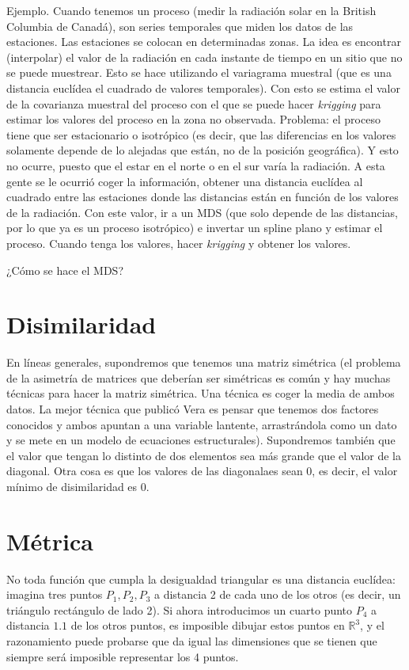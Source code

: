 \begin{description}
        Ejemplo. Cuando tenemos un proceso (medir la radiación solar en la British Columbia de Canadá), son series temporales que miden los datos de las estaciones. Las estaciones se colocan en determinadas zonas. La idea es encontrar (interpolar) el valor de la radiación en cada instante de tiempo en un sitio que no se puede muestrear. Esto se hace utilizando el variagrama muestral (que es una distancia euclídea el cuadrado de valores temporales). Con esto se estima el valor de la covarianza muestral del proceso con el que se puede hacer \textit{krigging} para estimar los valores del proceso en la zona no observada. Problema: el proceso tiene que ser estacionario o isotrópico (es decir, que las diferencias en los valores solamente depende de lo alejadas que están, no de la posición geográfica). Y esto no ocurre, puesto que el estar en el norte o en el sur varía la radiación. A esta gente se le ocurrió coger la información, obtener una distancia euclídea al cuadrado entre las estaciones donde las distancias están en función de los valores de la radiación. Con este valor, ir a un MDS (que solo depende de las distancias, por lo que ya es un proceso isotrópico) e invertar un spline plano y estimar el proceso. Cuando tenga los valores, hacer \textit{krigging} y obtener los valores.
\end{description}

¿Cómo se hace el MDS? %

\section{Disimilaridad}
En líneas generales, supondremos que tenemos una matriz simétrica (el problema de la asimetría de matrices que deberían ser simétricas es común y hay muchas técnicas para hacer la matriz simétrica. Una técnica es coger la media de ambos datos. La mejor técnica que publicó Vera es pensar que tenemos dos factores conocidos y ambos apuntan a una variable lantente, arrastrándola como un dato y se mete en un modelo de ecuaciones estructurales). Supondremos también que el valor que tengan lo distinto de dos elementos sea más grande que el valor de la diagonal. Otra cosa es que los valores de las diagonalaes sean 0, es decir, el valor mínimo de disimilaridad es 0.\\

\section{Métrica}
No toda función que cumpla la desigualdad triangular es una distancia euclídea: imagina tres puntos $P_1,P_2,P_3$ a distancia 2 de cada uno de los otros (es decir, un triángulo rectángulo de lado 2). Si ahora introducimos un cuarto punto $P_4$ a distancia $1.1$ de los otros puntos, es imposible dibujar estos puntos en $\mathbb{R}^3$, y el razonamiento puede probarse que da igual las dimensiones que se tienen que siempre será imposible representar los 4 puntos.

